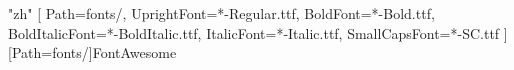 \usepackage{etoolbox} %
\usepackage{supertabular} %
\setlength\parindent{0pt} %


\usepackage{geometry} %
\geometry{
	hmargin=1.5cm, %
	vmargin=1.75cm, %
	a4paper, %
}


\usepackage{paracol} %
\setlength{} %



\usepackage{fontspec} %
\usepackage[sf,scale=0.95]{libertine} %
\usepackage{xeCJK} %

\XeTeXlinebreaklocale "zh"
\setmainfont{EBGaramond}[ %
	Path=fonts/, %
	UprightFont=*-Regular.ttf,
	BoldFont=*-Bold.ttf,
	BoldItalicFont=*-BoldItalic.ttf,
	ItalicFont=*-Italic.ttf,
	SmallCapsFont=*-SC.ttf
]
\newfontfamily{}
\newfontfamily{\FA}[Path=fonts/]{FontAwesome} 
 


